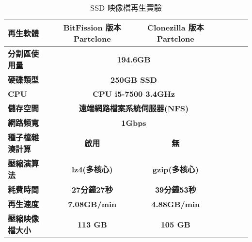 \begin{table}[htbp]
\centering
\caption{SSD 映像檔再生實驗}
\label{pcspec}
\begin{adjustbox}{max width=0.92\textwidth}
\begin{tabular}{lcccccc}

\toprule
\multicolumn{1}{l}{\textbf{再生軟體}} & \textbf{BitFission 版本 Partclone} & \textbf{Clonezilla 版本 Partclone} \\ \midrule
\multicolumn{1}{l}{\textbf{分割區使用量}} & \multicolumn{2}{c}{\textbf{194.6GB}} \\

\multicolumn{1}{l}{\textbf{硬碟類型}} & \multicolumn{2}{c}{\textbf{250GB SSD}} \\

\multicolumn{1}{l}{\textbf{CPU}} & \multicolumn{2}{c}{\textbf{CPU i5-7500 3.4GHz}} \\

\multicolumn{1}{l}{\textbf{儲存空間}} & \multicolumn{2}{c}{\textbf{遠端網路檔案系統伺服器(NFS)}} \\

\multicolumn{1}{l}{\textbf{網路頻寬}} & \multicolumn{2}{c}{\textbf{1Gbps}} \\

\multicolumn{1}{l}{\textbf{種子檔雜湊計算}} & \textbf{啟用} & \textbf{無} \\

\multicolumn{1}{l}{\textbf{壓縮演算法}} & \textbf{lz4(多核心)} & \textbf{gzip(多核心)} \\

\multicolumn{1}{l}{\textbf{耗費時間}} & \textbf{27分鐘27秒} & \textbf{39分鐘53秒} \\

\multicolumn{1}{l}{\textbf{再生速度}} & \textbf{7.08GB/min} & \textbf{4.88GB/min} \\

\multicolumn{1}{l}{\textbf{壓縮映像檔大小}} & \textbf{113 GB} & \textbf{105 GB} \\

\bottomrule
\end{tabular}
\end{adjustbox}
\end{table}
